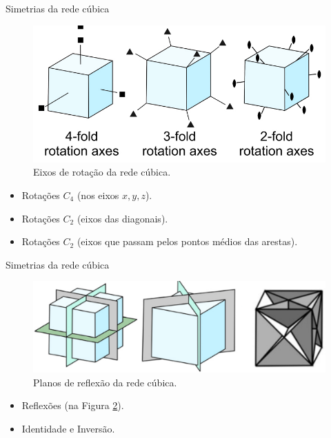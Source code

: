\documentclass[aspectratio=169]{beamer}
\begin{document}
\begin{frame}{Simetrias da rede cúbica}

\begin{figure}[H]
\centering
\includegraphics[width=0.6\linewidth]{fig/rot_cubic.png}
\caption{Eixos de rotação da rede cúbica.}
\label{fig:rot_cubic}
\end{figure}


\begin{itemize}
\item Rotações $C_4$ (nos eixos $x, y, z$).
\item Rotações $C_2$ (eixos das diagonais).
\item Rotações $C_2$ (eixos que passam pelos pontos médios das arestas).
\end{itemize}

\end{frame}




\begin{frame}{Simetrias da rede cúbica}

\begin{figure}[H]
\centering
\includegraphics[width=0.6\linewidth]{fig/reflex_cubic.png}
\caption{Planos de reflexão da rede cúbica.}
\label{fig:reflex_cubic}
\end{figure}


\begin{itemize}
\item Reflexões (na Figura \ref{fig:reflex_cubic}).
\n
\item Identidade e Inversão.
\end{itemize}

\end{frame}


\end{document}
